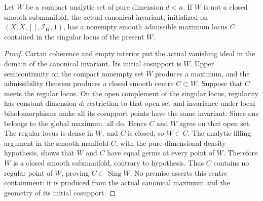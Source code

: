 \begin{lemma}
\label{hir:fresh-current-centre-singular}
\leanok
Let $W$ be a compact analytic set of pure dimension $d<n$. If $W$ is not a
closed smooth submanifold, the actual canonical invariant, initialized on
$(X,X,[],\mathcal I_W,1)$, has a nonempty smooth admissible maximum locus
$C$ contained in the singular locus of the present $W$.
\end{lemma}
\begin{proof}
Cartan coherence and empty interior put the actual vanishing ideal in the
domain of the canonical invariant. Its initial cosupport is $W$. Upper
semicontinuity on the compact nonempty set $W$ produces a maximum, and the
admissibility theorem produces a closed smooth centre $C\subset W$.
Suppose that $C$ meets the regular locus. On the open complement of the
singular locus, regularity has constant dimension $d$; restriction to that
open set and invariance under local biholomorphisms make all its cosupport
points have the same invariant. Since one belongs to the global maximum,
all do. Hence $C$ and $W$ agree on that open set. The regular locus is dense
in $W$, and $C$ is closed, so $W\subset C$. The analytic filling argument
in the smooth manifold $C$, with the pure-dimensional density hypothesis,
shows that $W$ and $C$ have equal germs at every point of $W$. Therefore
$W$ is a closed smooth submanifold, contrary to hypothesis. Thus $C$
contains no regular point of $W$, proving $C\subset\operatorname{Sing}W$.
No premise asserts this centre containment: it is produced from the actual
canonical maximum and the geometry of its initial cosupport.
\end{proof}

